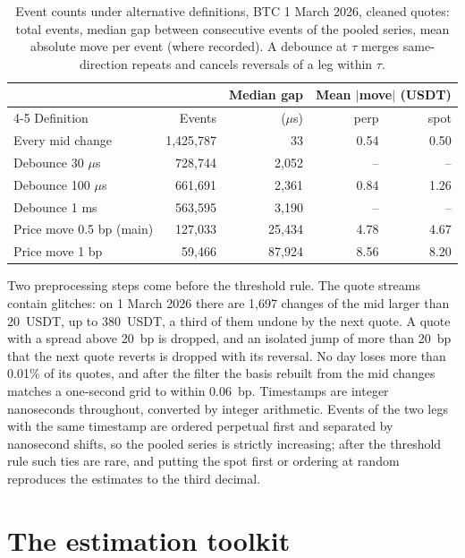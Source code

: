 \documentclass[a4paper,11pt]{article}
\begin{document}
\begin{table}[htbp]
\centering
\caption{Event counts under alternative definitions, BTC 1 March 2026, cleaned quotes: total events, median gap between consecutive events of the pooled series, mean absolute move per event (where recorded). A debounce at $\tau$ merges same-direction repeats and cancels reversals of a leg within $\tau$.}
\label{tab:definitions}
\small
\begin{tabular}{@{}lrrrr@{}}
\toprule
 & & Median gap & \multicolumn{2}{c}{Mean $|$move$|$ (USDT)} \\
\cmidrule(lr){4-5}
Definition & Events & ($\mu$s) & perp & spot \\
\midrule
Every mid change & 1,425,787 & 33 & 0.54 & 0.50 \\
Debounce 30 $\mu$s & 728,744 & 2,052 & -- & -- \\
Debounce 100 $\mu$s & 661,691 & 2,361 & 0.84 & 1.26 \\
Debounce 1 ms & 563,595 & 3,190 & -- & -- \\
Price move 0.5 bp (main) & 127,033 & 25,434 & 4.78 & 4.67 \\
Price move 1 bp & 59,466 & 87,924 & 8.56 & 8.20 \\
\bottomrule
\end{tabular}
\end{table}

Two preprocessing steps come before the threshold rule. The quote streams contain glitches: on 1 March 2026 there are 1,697 changes of the mid larger than 20~USDT, up to 380~USDT, a third of them undone by the next quote. A quote with a spread above 20~bp is dropped, and an isolated jump of more than 20~bp that the next quote reverts is dropped with its reversal. No day loses more than 0.01\% of its quotes, and after the filter the basis rebuilt from the mid changes matches a one-second grid to within 0.06~bp. Timestamps are integer nanoseconds throughout, converted by integer arithmetic. Events of the two legs with the same timestamp are ordered perpetual first and separated by nanosecond shifts, so the pooled series is strictly increasing; after the threshold rule such ties are rare, and putting the spot first or ordering at random reproduces the estimates to the third decimal.

\section{The estimation toolkit}\label{sec:toolkit}
\end{document}
